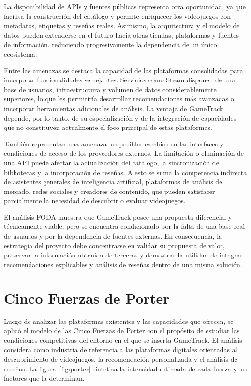 La disponibilidad de APIs y fuentes públicas representa otra oportunidad, ya que facilita la construcción del catálogo y permite enriquecer los videojuegos con metadatos, etiquetas y reseñas reales. Asimismo, la arquitectura y el modelo de datos pueden extenderse en el futuro hacia otras tiendas, plataformas y fuentes de información, reduciendo progresivamente la dependencia de un único ecosistema.

Entre las amenazas se destaca la capacidad de las plataformas consolidadas para incorporar funcionalidades semejantes. Servicios como Steam disponen de una base de usuarios, infraestructura y volumen de datos considerablemente superiores, lo que les permitiría desarrollar recomendaciones más avanzadas o incorporar herramientas adicionales de análisis. La ventaja de GameTrack depende, por lo tanto, de su especialización y de la integración de capacidades que no constituyen actualmente el foco principal de estas plataformas.

También representan una amenaza los posibles cambios en las interfaces y condiciones de acceso de los proveedores externos. La limitación o eliminación de una API puede afectar la actualización del catálogo, la sincronización de bibliotecas y la incorporación de reseñas. A esto se suma la competencia indirecta de asistentes generales de inteligencia artificial, plataformas de análisis de mercado, redes sociales y creadores de contenido, que pueden satisfacer parcialmente la necesidad de descubrir o evaluar videojuegos.

El análisis FODA muestra que GameTrack posee una propuesta diferencial y técnicamente viable, pero se encuentra condicionado por la falta de una base real de usuarios y por la dependencia de fuentes externas. En consecuencia, la estrategia del proyecto debe concentrarse en validar su propuesta de valor, preservar la información obtenida de terceros y demostrar la utilidad de integrar recomendaciones explicables y análisis de reseñas dentro de una misma solución.

\section{Cinco Fuerzas de Porter}\label{sec:porter}

Luego de analizar las plataformas existentes y las capacidades que ofrecen, se aplicó el modelo de las Cinco Fuerzas de Porter con el propósito de estudiar las condiciones competitivas del entorno en el que se inserta GameTrack. El análisis considera como industria de referencia a las plataformas digitales orientadas al descubrimiento de videojuegos, la recomendación personalizada y el análisis de reseñas. La figura~\ref{fig:porter} sintetiza la intensidad estimada de cada fuerza y los factores que la determinan.

